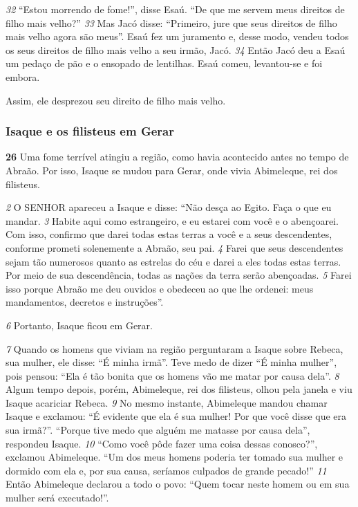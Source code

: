 \bigskip   
\textit{\tiny 32}
“Estou morrendo de fome!”, disse Esaú. “De que me servem meus direitos de
filho mais velho?”
\textit{\tiny 33}
Mas Jacó disse: “Primeiro, jure que seus direitos de filho mais velho agora são
meus”. Esaú fez um juramento e, desse modo, vendeu todos os seus direitos de
filho mais velho a seu irmão, Jacó.
\textit{\tiny 34}
Então Jacó deu a Esaú um pedaço de pão e o ensopado de lentilhas. Esaú
comeu, levantou-se e foi embora. 

\bigskip   
Assim, ele desprezou seu direito de filho mais
velho.


\subsubsection*{Isaque e os filisteus em Gerar}
   
\textbf{\large 26}
 Uma fome terrível atingiu a região, como havia acontecido antes no tempo
de Abraão. Por isso, Isaque se mudou para Gerar, onde vivia Abimeleque, rei dos
filisteus.

\bigskip   
\textit{\tiny 2}
O SENHOR apareceu a Isaque e disse: “Não desça ao Egito. Faça o que eu
mandar. 
\textit{\tiny 3}
Habite aqui como estrangeiro, e eu estarei com você e o abençoarei.
Com isso, confirmo que darei todas estas terras a você e a seus descendentes,
conforme prometi solenemente a Abraão, seu pai. 
\textit{\tiny 4}
Farei que seus descendentes
sejam tão numerosos quanto as estrelas do céu e darei a eles todas estas terras.
Por meio de sua descendência, todas as nações da terra serão abençoadas. 
\textit{\tiny 5}
Farei
isso porque Abraão me deu ouvidos e obedeceu ao que lhe ordenei: meus
mandamentos, decretos e instruções”. 

\bigskip   
\textit{\tiny 6}
Portanto, Isaque ficou em Gerar.

\bigskip   
\textit{\tiny 7}
Quando os homens que viviam na região perguntaram a Isaque sobre Rebeca,
sua mulher, ele disse: “É minha irmã”. Teve medo de dizer “É minha mulher”, pois
pensou: “Ela é tão bonita que os homens vão me matar por causa dela”. 
\textit{\tiny 8}
Algum
tempo depois, porém, Abimeleque, rei dos filisteus, olhou pela janela e viu Isaque
acariciar Rebeca.
\textit{\tiny 9}
No mesmo instante, Abimeleque mandou chamar Isaque e exclamou: “É
evidente que ela é sua mulher! Por que você disse que era sua irmã?”.
   “Porque tive medo que alguém me matasse por causa dela”, respondeu Isaque.
\textit{\tiny 10}
“Como você pôde fazer uma coisa dessas conosco?”, exclamou Abimeleque.
“Um dos meus homens poderia ter tomado sua mulher e dormido com ela e, por
sua causa, seríamos culpados de grande pecado!”
\textit{\tiny 11}
Então Abimeleque declarou a todo o povo: “Quem tocar neste homem ou em
sua mulher será executado!”.



